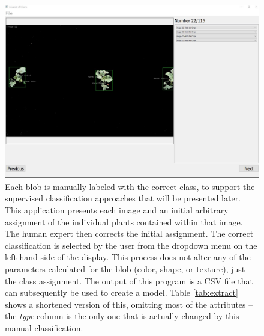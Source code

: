 \documentclass[letterpaper, notitlepage]{report}
\begin{document}
\begin{figure}[H]
	\centering
	\includegraphics[width=\linewidth]{./figures/review-application.jpg}
	\caption[Manual classification application screenshot]{Each blob is manually labeled with the correct class, to support the supervised classification approaches that will  be presented later. This application presents each image and an initial arbitrary assignment of the individual plants contained within that image. The human expert then corrects the initial assignment. The correct classification is selected by the user from the dropdown menu on the left-hand side of the display. This process does not alter any of the parameters calculated for the blob (color, shape, or texture), just the class assignment. The output of this program is a CSV file that can subsequently be used to create a model. Table \ref{tab:extract} shows a shortened version of this, omitting most of the attributes -- the \textit{type} column is the only one that is actually changed by this manual classification.}
	\label{fig:review-application}
\end{figure}
\end{document}
